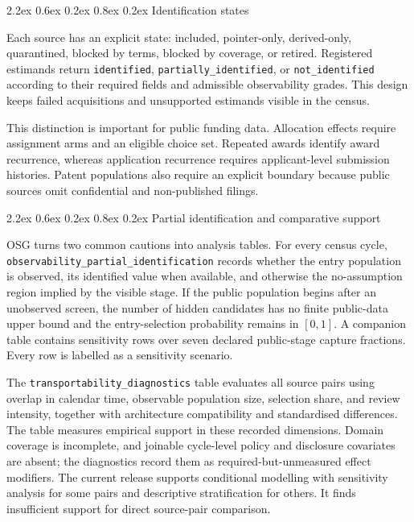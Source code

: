 \documentclass[
  10pt,
]{article}
\makeatletter
\renewcommand\subsection{\@startsection{subsection}{2}{\z@}%
  {2.2ex \@plus 0.6ex \@minus 0.2ex}%
  {0.8ex \@plus 0.2ex}%
  {\normalfont\large\sffamily\bfseries\color{OSGInk}}}
\makeatother
\begin{document}
\subsection{Identification states}
\label{25-failure-and-non-identification}

Each source has an explicit state: included, pointer-only, derived-only,
quarantined, blocked by terms, blocked by coverage, or retired.
Registered estimands return \texttt{identified},
\texttt{partially\_identified}, or \texttt{not\_identified} according to
their required fields and admissible observability grades. This design
keeps failed acquisitions and unsupported estimands visible in the
census.

This distinction is important for public funding data. Allocation
effects require assignment arms and an eligible choice set. Repeated
awards identify award recurrence, whereas application recurrence
requires applicant-level submission histories. Patent populations also
require an explicit boundary because public sources omit confidential
and non-published filings.

\subsection{Partial identification and comparative support}
\label{partial-identification-and-comparative-support}

OSG turns two common cautions into analysis tables. For every census
cycle, \texttt{observability\_\allowbreak partial\_\allowbreak identification} records whether
the entry population is observed, its identified value when available,
and otherwise the no-assumption region implied by the visible stage. If
the public population begins after an unobserved screen, the number of
hidden candidates has no finite public-data upper bound and the
entry-selection probability remains in $[0,1]$. A companion table
contains \OSGClaimHiddenScreenSensitivityRows{} sensitivity rows over seven
declared public-stage capture fractions. Every row is labelled as a
sensitivity scenario.

The \texttt{transportability\_\allowbreak diagnostics} table evaluates all
\OSGClaimTransportSourcePairs{}
source pairs using overlap in calendar time, observable population size,
selection share, and review intensity, together with architecture
compatibility and standardised differences. The table measures empirical
support in these recorded dimensions. Domain coverage is incomplete,
and joinable cycle-level policy and disclosure covariates are absent;
the diagnostics record them as required-but-unmeasured effect modifiers.
The current release supports conditional modelling with sensitivity
analysis for some pairs and descriptive stratification for others. It
finds insufficient support for direct source-pair comparison.
\end{document}
